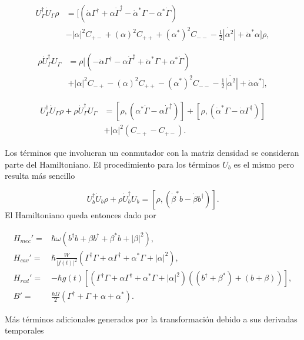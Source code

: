 \documentclass[10pt,a4paper]{report}
\begin{document}
\begin{align}
U_\Gamma^\dagger \dot{U}_\Gamma \rho &= [(\dot{\alpha}\Gamma^\dagger + \alpha \dot{\Gamma}^\dagger - \dot{\alpha}^*\Gamma -\alpha^*\dot{\Gamma} ) \\
 &- |\alpha|^2C_{+-} + (\alpha)^2C_{++} + (\alpha^*)^2 C_{--} - \frac{1}{2}\dot{|\alpha^2|} + \dot{\alpha}^*\alpha]\rho \nonumber,
\end{align}

\begin{align}
 \rho \dot{U}_\Gamma^\dagger U_\Gamma &= \rho[(-\dot{\alpha}\Gamma^\dagger - \alpha \dot{\Gamma}^\dagger + \dot{\alpha}^*\Gamma +\alpha^*\dot{\Gamma} ) \\
 &+ |\alpha|^2C_{-+} - (\alpha)^2C_{++} - (\alpha^*)^2 C_{--} - \frac{1}{2}\dot{|\alpha^2|} + \dot{\alpha}\alpha^*], \nonumber
\end{align}

\begin{align}
U_\Gamma^\dagger \dot{U}_\Gamma \rho + \rho \dot{U}_\Gamma^\dagger U_\Gamma &= [\rho, (\alpha^*\dot{\Gamma} - \alpha\dot{\Gamma}^\dagger)] + [\rho, (\dot{\alpha}^*\Gamma - \dot{\alpha}\Gamma^\dagger)] \\
&+|\alpha|^2 (C_{-+} - C_{+-}).
\end{align} 

Los términos que involucran un conmutador con la matriz densidad se consideran parte del Hamiltoniano. El procedimiento para los términos  $U_b$ es el mismo pero resulta más sencillo

\begin{equation}
U_b^\dagger \dot{U}_b \rho+ \rho \dot{U}_b^\dagger U_b = [\rho, (\dot{\beta}^*b - \dot{\beta}b^\dagger)].
\end{equation} El Hamiltoniano queda entonces dado por

\begin{align}
H_{mec}' =& \hbar \omega(b^{\dagger}b +\beta b^{\dagger}+\beta^* b + |\beta|^2),\\
H_{cav}' =& \hbar\frac{W}{|f(t)|^2}(\Gamma^{\dagger}\Gamma + \alpha \Gamma^{\dagger} + \alpha^* \Gamma + |\alpha|^2 ),\\
H_{rad}'=&-\hbar g(t)[(\Gamma^{\dagger}\Gamma + \alpha \Gamma^{\dagger} + \alpha^* \Gamma + |\alpha|^2 )((b^{\dagger}+\beta^*)+(b+\beta))],\\
B' =& \frac{\hbar \Omega}{2}(\Gamma^{\dagger} + \Gamma +\alpha + \alpha^*).
\end{align}

Más términos adicionales generados por la transformación debido a sus derivadas temporales
\end{document}
